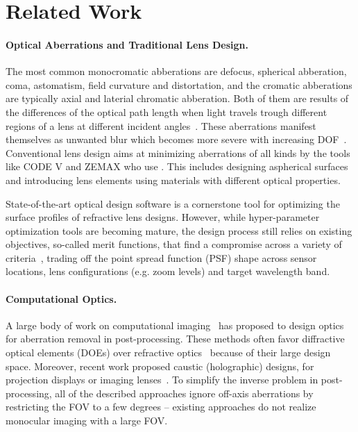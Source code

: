 

\section{Related Work}
\label{sec:related_work}

\paragraph{Optical Aberrations and Traditional Lens Design.}
 The most common monocromatic abberations are defocus, spherical abberation, coma, astomatism, field
 curvature and distortation, and the cromatic abberations are typically axial and laterial chromatic
 abberation. Both of them are results of the differences of the optical path length when light travels
 trough different regions of a lens at different incident angles~\cite{fowles2012introduction}. These
 aberrations manifest themselves as unwanted blur which becomes more severe with increasing DOF~\cite{smith2005modern}. 
 Conventional lens design aims at minimizing aberrations of all kinds
by the tools like CODE V and ZEMAX who use . 
This includes designing aspherical surfaces and introducing lens elements using materials 
with different optical properties.

State-of-the-art optical design software is a cornerstone tool for optimizing
the surface profiles of refractive lens designs.
However, while hyper-parameter optimization tools are becoming mature, the design process still relies on existing objectives, so-called merit functions, that find a compromise across a variety of criteria~\cite{malacara2016handbook,shih2012image}, trading off the point spread function (PSF) shape across sensor locations, lens configurations (e.g. zoom levels) and target wavelength band. 


\paragraph{Computational Optics.}
%
A large body of work on computational imaging~\cite{dowski1995extended,stork2013lensless,stork2014optical,levin20094d} has proposed to design optics for aberration removal in post-processing. %
These methods often favor diffractive optical elements (DOEs) over refractive optics~\cite{monjur2015ultra,antipa2018diffusercam,heide2016encoded,peng2016diffractive} because of their large design space. 
Moreover, recent work proposed caustic (holographic) designs, for projection displays or imaging lenses~\cite{papas2012magic,schwartzburg2014high,peng2017mix}.
To simplify the inverse problem in post-processing, all of the described approaches ignore off-axis aberrations by restricting the FOV to a few degrees -- {existing approaches do not realize monocular imaging with a large FOV}. 


